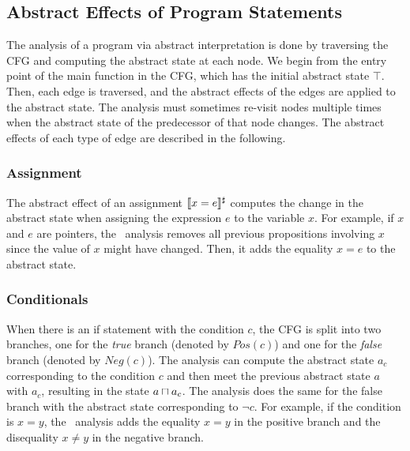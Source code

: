 \subsection{Abstract Effects of Program Statements}
The analysis of a program via abstract interpretation is done by traversing the CFG and computing the abstract state at each node.
We begin from the entry point of the \textsf{main} function in the CFG, which has the initial abstract state $\top$.
Then, each edge is traversed, and the abstract effects of the edges are applied to the abstract state.
The analysis must sometimes re-visit nodes multiple times when the abstract state of the predecessor of that node changes.
The abstract effects of each type of edge are described in the following.

\subsubsection{Assignment}
The abstract effect of an assignment $\llbracket x = e\rrbracket^\sharp$ computes the change in the abstract state when assigning the expression $e$ to the variable $x$.
For example, if $x$ and $e$ are pointers, the \cpo\ analysis removes all previous propositions involving $x$ since the value of $x$ might have changed.
Then, it adds the equality $x = e$ to the abstract state.
\subsubsection{Conditionals}
When there is an \textsf{if} statement with the condition $c$, the CFG is split into two branches, one for the \emph{true} branch (denoted by $Pos(c)$) and one for the \emph{false} branch (denoted by $Neg(c)$).
The analysis can compute the abstract state $a_c$ corresponding to the condition $c$ and then meet the previous abstract state $a$ with $a_c$, resulting in the state $a \sqcap a_c$.
The analysis does the same for the false branch with the abstract state corresponding to $\neg c$.
For example, if the condition is $x = y$, the \cpo\ analysis adds the equality $x = y$ in the positive branch and the disequality $x \neq y$ in the negative branch.
